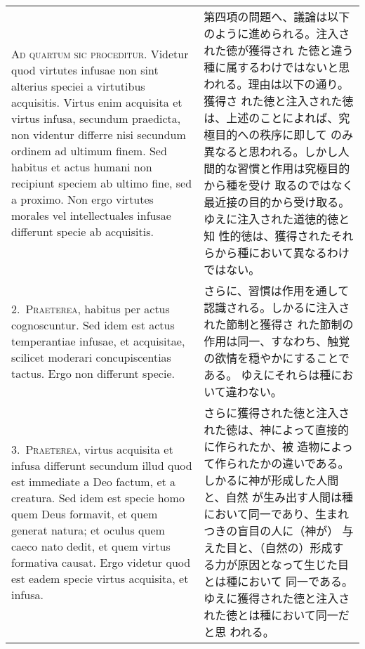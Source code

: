 \documentclass[10pt]{jsarticle}
\begin{document}
\begin{longtable}{p{21em}p{21em}}
{\scshape Ad quartum sic proceditur}. Videtur quod virtutes infusae
non sint alterius speciei a virtutibus acquisitis. Virtus enim
acquisita et virtus infusa, secundum praedicta, non videntur differre
nisi secundum ordinem ad ultimum finem. Sed habitus et actus humani
non recipiunt speciem ab ultimo fine, sed a proximo. Non ergo virtutes
morales vel intellectuales infusae differunt specie ab acquisitis.


&

 第四項の問題へ、議論は以下のように進められる。注入された徳が獲得され
 た徳と違う種に属するわけではないと思われる。理由は以下の通り。獲得さ
 れた徳と注入された徳は、上述のことによれば、究極目的への秩序に即して
 のみ異なると思われる。しかし人間的な習慣と作用は究極目的から種を受け
 取るのではなく最近接の目的から受け取る。ゆえに注入された道徳的徳と知
 性的徳は、獲得されたそれらから種において異なるわけではない。
 
\\


2.~{\scshape Praeterea}, habitus per actus cognoscuntur. Sed idem est
actus temperantiae infusae, et acquisitae, scilicet moderari
concupiscentias tactus. Ergo non differunt specie.

&

 さらに、習慣は作用を通して認識される。しかるに注入された節制と獲得さ
 れた節制の作用は同一、すなわち、触覚の欲情を穏やかにすることである。
 ゆえにそれらは種において違わない。
 
\\




3.~{\scshape Praeterea}, virtus acquisita et infusa differunt secundum
illud quod est immediate a Deo factum, et a creatura. Sed idem est
specie homo quem Deus formavit, et quem generat natura; et oculus quem
caeco nato dedit, et quem virtus formativa causat. Ergo videtur quod
est eadem specie virtus acquisita, et infusa.

&

 さらに獲得された徳と注入された徳は、神によって直接的に作られたか、被
 造物によって作られたかの違いである。しかるに神が形成した人間と、自然
 が生み出す人間は種において同一であり、生まれつきの盲目の人に（神が）
 与えた目と、（自然の）形成する力が原因となって生じた目とは種において
 同一である。ゆえに獲得された徳と注入された徳とは種において同一だと思
 われる。
 
\\





\end{longtable}
\end{document}
